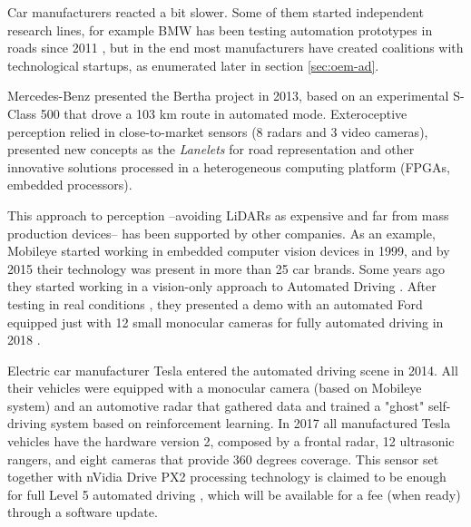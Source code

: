 Car manufacturers reacted a bit slower. 
Some of them started independent research lines, for example
BMW has been testing automation prototypes in roads since 2011 
\cite{Aeberhard2015a}, but in the end most manufacturers have created
coalitions with technological startups, as enumerated later in section
\ref{sec:oem-ad}.

Mercedes-Benz presented the Bertha project in 2013, based on an experimental 
S-Class 500 that drove a 103 km route in automated mode. Exteroceptive 
perception relied in close-to-market sensors (8 radars and 3 video cameras), 
presented new concepts as the \emph{Lanelets} for road representation 
\cite{Ziegler2014} and other innovative solutions \cite{Bender2014} processed
in a heterogeneous computing platform (FPGAs, embedded processors). 

This approach to perception --avoiding LiDARs as expensive and far from mass 
production devices-- has been supported by other companies. As an example,
Mobileye started working in embedded computer vision devices in 1999, and by
2015 their technology was present in more than 25 car brands. Some years ago
they started working in a vision-only approach to Automated Driving 
\cite{Mobileye2018}. 
After testing in real conditions \cite{Edelstein2018}, they presented a demo with an automated Ford equipped just with 12 small monocular cameras for fully automated driving in 2018 \cite{Scheer2018}.

Electric car manufacturer Tesla entered the automated driving scene in 2014.
All their vehicles were equipped with a monocular camera (based on 
Mobileye system) and an automotive radar that gathered data and trained a 
"ghost" self-driving system based on reinforcement learning. In 2017 all 
manufactured Tesla vehicles have the hardware version 2, composed by a frontal 
radar, 12 ultrasonic rangers, and eight cameras that provide 360 
degrees coverage. This sensor set together with nVidia Drive PX2 processing 
technology is claimed to be enough for full Level 5 automated driving
\cite{Hawkins2017}, which will be available for a fee (when ready) through a
software update.

